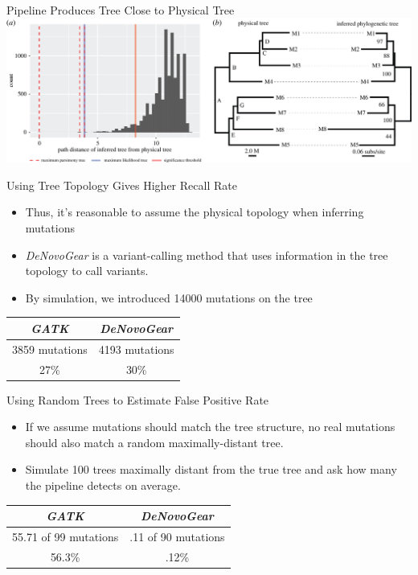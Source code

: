\documentclass[table]{beamer}
\begin{document}
\begin{frame}{Pipeline Produces Tree Close to Physical Tree}
	\includegraphics[width=\linewidth]{emel_2.jpg}
\end{frame}

\begin{frame}{Using Tree Topology Gives Higher Recall Rate}
	\begin{itemize}
	\item Thus, it's reasonable to assume the physical topology when inferring mutations
	\item \textit{DeNovoGear} is a variant-calling method that uses information in the tree topology to call variants.
	\item By simulation, we introduced 14000 mutations on the tree
	\end{itemize}
	\begin{center}
	\begin{tabular}{ c | c }
	\textit{GATK} & \textit{DeNovoGear} \\
	\hline
	3859 mutations & 4193 mutations \\
	27\% & 30\%
	\end{tabular}
	\end{center}
\end{frame}

\begin{frame}{Using Random Trees to Estimate False Positive Rate}
\begin{itemize}
	\item If we assume mutations should match the tree structure, no real mutations should also match a random maximally-distant tree.
	\item Simulate 100 trees maximally distant from the true tree and ask how many the pipeline detects on average.
\end{itemize}
\begin{center}
\begin{tabular}{ c | c }
	\textit{GATK} & \textit{DeNovoGear} \\
	\hline
	55.71 of 99 mutations & .11 of 90 mutations \\
	56.3\% & .12\%
\end{tabular}
\end{center}
\end{frame}
\end{document}
